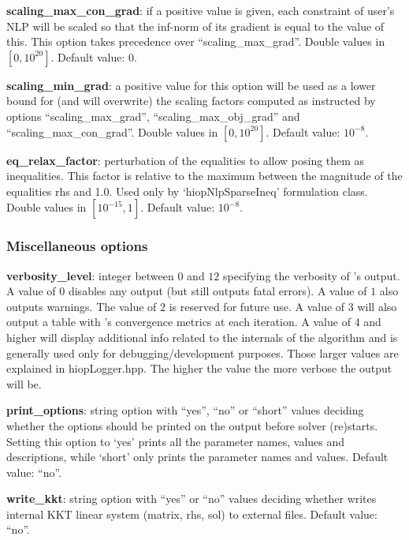 \noindent \textbf{scaling\_max\_con\_grad}: if a positive value is given, each constraint of user's NLP will be scaled so that the inf-norm of its gradient is equal to the value of this. This option takes precedence over ``scaling\_max\_grad''. Double values in $[0, 10^{20}]$. Default value: $0$.
\medskip

\noindent \textbf{scaling\_min\_grad}: a positive value for this option will be used as a lower bound for (and will overwrite) the scaling factors computed as instructed by options ``scaling\_max\_grad'', ``scaling\_max\_obj\_grad'' and ``scaling\_max\_con\_grad''. Double values in $[0, 10^{20}]$. Default value: $10^{-8}$.
\medskip

\noindent \textbf{eq\_relax\_factor}: perturbation of the equalities to allow posing them as inequalities. This factor is relative to the maximum between the magnitude of the equalities rhs and 1.0. Used only by `hiopNlpSparseIneq' formulation class. Double values in $[10^{-15}, 1]$. Default value: $10^{-8}$.
\medskip




\subsubsection{Miscellaneous options}

\noindent \textbf{verbosity\_level}: integer between $0$ and $12$ specifying the verbosity of \Hi's output. A value of $0$ disables any output (but still outputs fatal errors). A value of $1$ also outputs warnings. The value of $2$ is reserved for future use. A value of $3$ will also output a table with \Hi's convergence metrics at each iteration. A value of $4$ and higher will display additional info related to the internals of the algorithm and is generally used only for debugging/development purposes. Those larger values are explained in hiopLogger.hpp. The higher the value the more verbose the output will be.
\medskip

\noindent \textbf{print\_options}: string option with ``yes'', ``no'' or ``short'' values deciding whether the options should be printed on the output before solver (re)starts. Setting this option to `yes' prints all the parameter names, values and descriptions, while `short' only prints the parameter names and values. Default value: ``no''.
\medskip

\noindent \textbf{write\_kkt}: string option with ``yes'' or ``no'' values deciding whether \Hi writes internal KKT linear system (matrix, rhs, sol) to external files. Default value: ``no''.
\medskip

